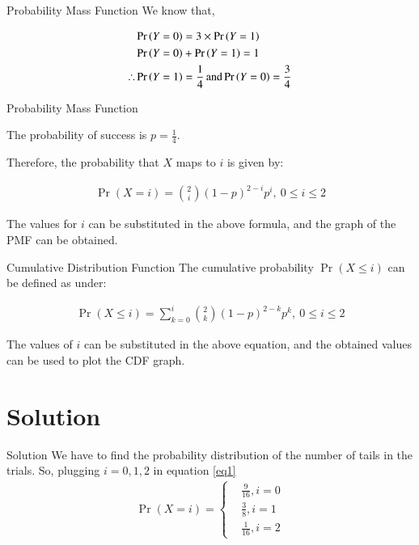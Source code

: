 \documentclass{beamer}
\providecommand{\pr}[1]{\ensuremath{\Pr\left(#1\right)}}
\begin{document}
\begin{frame}{Probability Mass Function}
We know that,
\begin{block}{}
       \begin{align}
            &\pr{Y=0} = 3\times \pr{Y=1}\\
            &\pr{Y=0} + \pr{Y=1} = 1\\
            \therefore &\pr{Y=1} = \frac{1}{4} \text{\,and} \pr{Y=0} = \frac{3}{4}
       \end{align}
\end{block}
\end{frame}
\begin{frame}{Probability Mass Function}
    

The probability of success is $p=\frac{1}{4}$.

Therefore, the probability that $X$ maps to $i$ is given by:
\begin{block}{}
       \begin{align}
                \label{eq1}
           \pr{X=i} = \binom{2}{i} (1-p)^{2-i} p^i ,~ 0 \le i \le 2 
       \end{align}
\end{block}

The values for $i$ can be substituted in the above formula, and the graph of the PMF can be obtained.
\end{frame}


\begin{frame}{Cumulative Distribution Function}
The cumulative probability $ \pr{X \leq i}$ can be defined as under:

\begin{block}{}
\begin{align}
          \label{eq2}
       \pr{X \leq i} = \sum_{k=0}^{i} \binom{2}{k} (1-p)^{2-k} p^k ,~ 0 \le i \le 2
\end{align}
\end{block}

The values of $i$ can be substituted in the above equation, and the obtained values can be used to plot the CDF graph.

\end{frame}


\section{Solution}
\begin{frame}{Solution}
We have to find the probability distribution of the number of tails in the trials. So, plugging $i=0,1,2$ in equation \eqref{eq1}
\begin{align}
    \pr{X=i} = 
    \begin{cases}
        &\frac{9}{16}, i = 0 \\
        &\frac{3}{8}, i = 1\\
        &\frac{1}{16}, i = 2
    \end{cases}
\end{align}
\end{frame}
\end{document}
